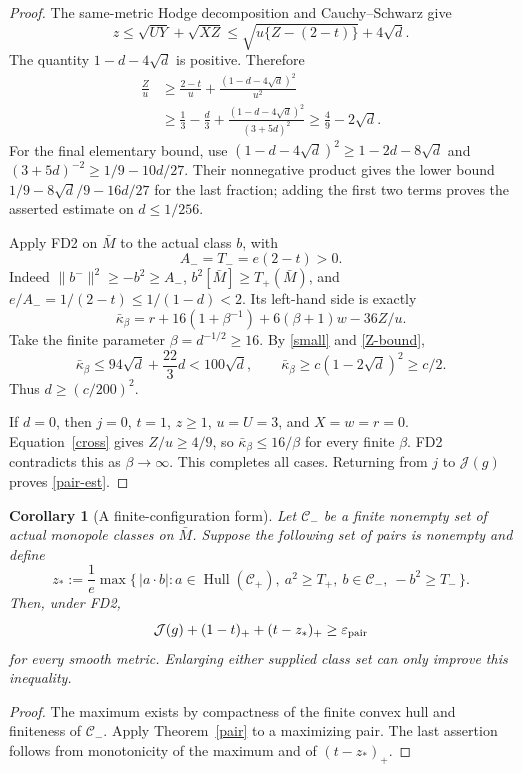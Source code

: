 \documentclass[11pt,a4paper]{article}
\newtheorem{corollary}[theorem]{Corollary}
\theoremstyle{definition}\newtheorem{assumption}[theorem]{Input}
\theoremstyle{remark}\newtheorem{remark}[theorem]{Remark}
\newcommand{\Hull}{\operatorname{Hull}}
\newcommand{\cJ}{\mathcal J}
\numberwithin{equation}{section}
\begin{document}
\begin{proof}
The same-metric Hodge decomposition and Cauchy--Schwarz give
\begin{equation}\label{cross}
 z\le\sqrt{UY}+\sqrt{XZ}
   \le\sqrt{u\{Z-(2-t)\}}+4\sqrt d.
\end{equation}
The quantity $1-d-4\sqrt d$ is positive. Therefore
\begin{align}
 \frac Zu&\ge\frac{2-t}{u}+\frac{(1-d-4\sqrt d)^2}{u^2}\\
 &\ge\frac13-\frac d3+
       \frac{(1-d-4\sqrt d)^2}{(3+5d)^2}
 \ge\frac49-2\sqrt d.\label{Z-bound}
\end{align}
For the final elementary bound, use
$(1-d-4\sqrt d)^2\ge1-2d-8\sqrt d$ and
$(3+5d)^{-2}\ge1/9-10d/27$. Their nonnegative product gives the lower bound
$1/9-8\sqrt d/9-16d/27$ for the last fraction; adding the first two terms proves the asserted estimate on $d\le1/256$.

Apply FD2 on $\bar M$ to the actual class $b$, with
\[
 A_-=T_-=e(2-t)>0.
\]
Indeed $\|b^-\|^2\ge-b^2\ge A_-$, $b^2[\bar M]\ge T_+(\bar M)$, and
$e/A_-=1/(2-t)\le1/(1-d)<2$.
Its left-hand side is exactly
\[
 \bar\kappa_\beta=r+16(1+\beta^{-1})+6(\beta+1)w-36Z/u.
\]
Take the finite parameter $\beta=d^{-1/2}\ge16$. By
\eqref{small} and \eqref{Z-bound},
\[
 \bar\kappa_\beta\le94\sqrt d+\frac{22}{3}d<100\sqrt d,
 \qquad
 \bar\kappa_\beta\ge c(1-2\sqrt d)^2\ge c/2.
\]
Thus $d\ge(c/200)^2$.

If $d=0$, then $j=0$, $t=1$, $z\ge1$, $u=U=3$, and $X=w=r=0$.
Equation~\eqref{cross} gives $Z/u\ge4/9$, so
$\bar\kappa_\beta\le16/\beta$ for every finite $\beta$. FD2 contradicts this as $\beta\to\infty$. This completes all cases. Returning from $j$ to $\cJ(g)$ proves \eqref{pair-est}.
\end{proof}

\begin{corollary}[A finite-configuration form]\label{config}
Let $\mathcal C_-$ be a finite nonempty set of actual monopole classes on $\bar M$. Suppose the following set of pairs is nonempty and define
\[
 z_*:=\frac1e\max\{\,|a\cdot b|:
 a\in\Hull(\mathcal C_+),\ a^2\ge T_+,\
 b\in\mathcal C_-,\ -b^2\ge T_-\,\}.
\]
Then, under FD2,
\[
 \cJ(g)+(1-t)_++(t-z_*)_+\ge\varepsilon_{\rm pair}
\]
for every smooth metric. Enlarging either supplied class set can only improve this inequality.
\end{corollary}
\begin{proof}
The maximum exists by compactness of the finite convex hull and finiteness of $\mathcal C_-$. Apply Theorem~\ref{pair} to a maximizing pair. The last assertion follows from monotonicity of the maximum and of $(t-z_*)_+$.
\end{proof}
\end{document}
